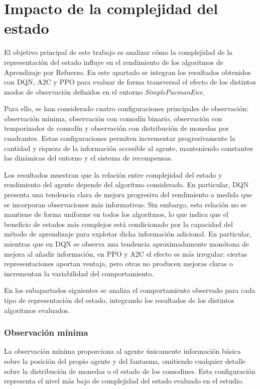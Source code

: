 \section{Impacto de la complejidad del estado}

El objetivo principal de este trabajo es analizar cómo la complejidad de la representación del estado influye en el rendimiento de los algoritmos de Aprendizaje por Refuerzo. En este apartado se integran los resultados obtenidos con DQN, A2C y PPO para evaluar de forma transversal el efecto de los distintos modos de observación definidos en el entorno \textit{SimplePacmanEnv}.

Para ello, se han considerado cuatro configuraciones principales de observación: observación mínima, observación con comodín binario, observación con temporizador de comodín y observación con distribución de monedas por cuadrantes. Estas configuraciones permiten incrementar progresivamente la cantidad y riqueza de la información accesible al agente, manteniendo constantes las dinámicas del entorno y el sistema de recompensas.

Los resultados muestran que la relación entre complejidad del estado y rendimiento del agente depende del algoritmo considerado. En particular, DQN presenta una tendencia clara de mejora progresiva del rendimiento a medida que se incorporan observaciones más informativas. Sin embargo, esta relación no se mantiene de forma uniforme en todos los algoritmos, lo que indica que el beneficio de estados más complejos está condicionado por la capacidad del método de aprendizaje para explotar dicha información adicional. En particular, mientras que en DQN se observa una tendencia aproximadamente monótona de mejora al añadir información, en PPO y A2C el efecto es más irregular: ciertas representaciones aportan ventaja, pero otras no producen mejoras claras o incrementan la variabilidad del comportamiento.

En los subapartados siguientes se analiza el comportamiento observado para cada tipo de representación del estado, integrando los resultados de los distintos algoritmos evaluados.

\subsubsection{Observación mínima}

La observación mínima proporciona al agente únicamente información básica sobre la posición del propio agente y del fantasma, omitiendo cualquier detalle sobre la distribución de monedas o el estado de los comodines. Esta configuración representa el nivel más bajo de complejidad del estado evaluado en el estudio.

